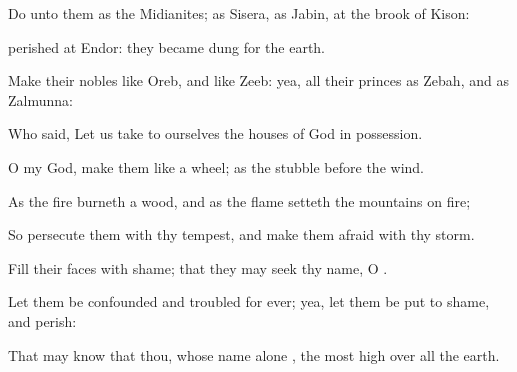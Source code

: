 {\Q {}Do unto them as
{} the
Midianites; as
{}
Sisera, as
{}
Jabin, at the
brook of
Kison:


\par }{\Q {}
perished at
Endor: they became
{}
dung for the
earth.


\par }{\Q {}Make their
nobles like
Oreb, and like
Zeeb: yea, all their
princes as
Zebah, and as
Zalmunna:


\par }{\Q {}Who
said, Let us take to ourselves the
houses of
God in
possession.


\par }{\Q {}O my
God,
make them like a
wheel; as the
stubble
before the
wind.


\par }{\Q {}As the
fire
burneth a
wood, and as the
flame
setteth the
mountains on
fire;


\par }{\Q {}So
persecute them with thy
tempest, and make them
afraid with thy
storm.


\par }{\Q {}Fill their
faces with
shame; that they may
seek thy
name, O
{}.


\par }{\Q {}Let them be
confounded and
troubled for
ever; yea, let them be put to
shame, and
perish:


\par }{\Q {}That
{} may
know that thou, whose
name alone
{}
{},
{} the most
high over all the
earth.




\par }
